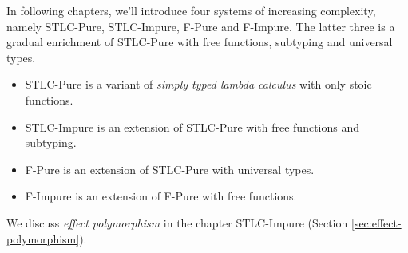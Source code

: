 In following chapters, we'll introduce four systems of increasing
complexity, namely STLC-Pure, STLC-Impure, F-Pure and F-Impure. The
latter three is a gradual enrichment of STLC-Pure with free functions,
subtyping and universal types.

\begin{itemize}
\item STLC-Pure is a variant of \emph{simply typed lambda calculus}
  with only stoic functions.
\item STLC-Impure is an extension of STLC-Pure with free functions and subtyping.
\item F-Pure is an extension of STLC-Pure with universal types.
\item F-Impure is an extension of F-Pure with free functions.
\end{itemize}

We discuss \emph{effect polymorphism} in the chapter STLC-Impure
(Section \ref{sec:effect-polymorphism}).
